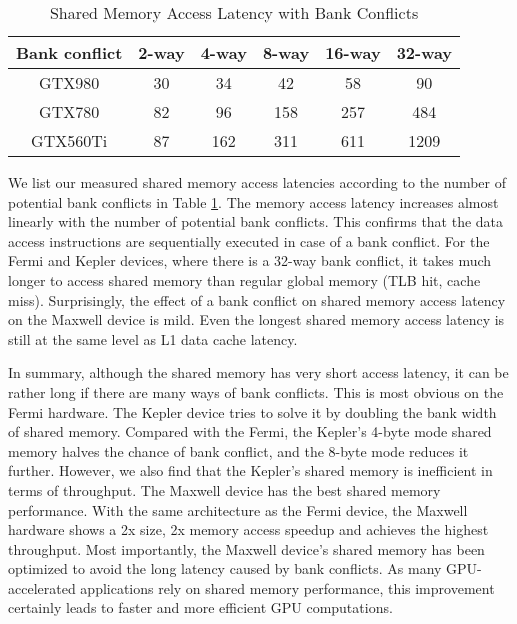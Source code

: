 \documentclass[10pt,journal,compsoc]{IEEEtran}
\theoremstyle{definition}
\begin{document}
\begin{table}

\renewcommand{\arraystretch}{1.1}
\centering
\caption{Shared Memory Access Latency with Bank Conflicts}
    \begin{tabular}{|c|c|c|c|c|c|}
            \hline
            Bank conflict& 2-way & 4-way &8-way&16-way&32-way \\ \hline
            GTX980  & 30& 34&42&58&90 \\ \hline
            GTX780  & 82 & 96 & 158 &257 &484\\ \hline
            GTX560Ti &87 &162 &311&611&1209 \\ \hline
    \end{tabular}
\label{tab:smemLatencyBankConflict}
\end{table}


We list our measured shared memory access latencies according to the number of potential bank conflicts in Table \ref{tab:smemLatencyBankConflict}. The memory access latency increases almost linearly with the number of potential bank conflicts. This confirms that the data access instructions are sequentially executed in case of a bank conflict. For the Fermi and Kepler devices, where there is a 32-way bank conflict, it takes much longer to access shared memory than regular global memory (TLB hit, cache miss). Surprisingly, the effect of a bank conflict on shared memory access latency on the Maxwell device is mild. Even the longest shared memory access latency is still at the same level as L1 data cache latency.

In summary, although the shared memory has very short access latency, it can be rather long if there are many ways of bank conflicts. This is most obvious on the Fermi hardware. The Kepler device tries to solve it by doubling the bank width of shared memory. Compared with the Fermi, the Kepler's 4-byte mode shared memory halves the chance of bank conflict, and the 8-byte mode reduces it further. However, we also find that the Kepler's shared memory is inefficient in terms of throughput. The Maxwell device has the best shared memory performance. With the same architecture as the Fermi device, the Maxwell hardware shows a 2x size, 2x memory access speedup and achieves the highest throughput. Most importantly, the Maxwell device's shared memory has been optimized to avoid the long latency caused by bank conflicts. As many GPU-accelerated applications rely on shared memory performance, this improvement certainly leads to faster and more efficient GPU computations.
\end{document}
